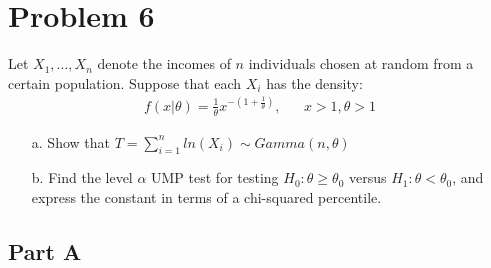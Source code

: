 \documentclass{article}
\begin{document}
\section*{Problem 6}
Let $X_1,...,X_n$ denote the incomes of $n$ individuals chosen at random from a certain population. Suppose that each $X_i$ has the density:
\begin{align*}
f(x|\theta) = \frac{1}{\theta} x^{-(1+\frac{1}{\theta})}, && x>1, \theta>1
\end{align*}
\begin{enumerate}
\item[a.] Show that $T=\sum_{i=1}^{n} ln(X_i) \sim Gamma(n,\theta)$
\item[b.]  Find the level $\alpha$ UMP test for testing $H_0:\theta \geq \theta_0$ versus $H_1: \theta < \theta_0$, and express the constant in terms of a chi-squared percentile.
\end{enumerate}

\subsection*{Part A}
\clearpage
\end{document}
